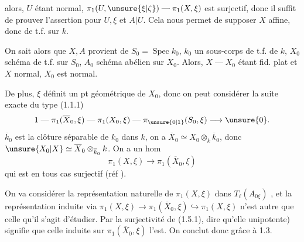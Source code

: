 alors,  $U$ étant normal, $\pi_1(U,\unsure{\xi|\zeta})\mathrel{\text{---}}\pi_1(X,\xi)$ est surjectif, donc il  suffit de prouver l'assertion pour $U,\xi$ et $A|U$. Cela nous permet de supposer $X$ affine, donc de t.f. sur $k$.

On sait alors que $X,A$ provient de $S_0=\operatorname{Spec}k_0$, $k_0$ un sous-corps de t.f. de $k$, $X_0$ schéma de t.f. sur $S_0$, $A_0$ schéma abélien sur $X_0$. Alors,  $X\mathrel{\text{---}}X_0$ étant fid. plat et $X$ normal, $X_0$ est normal.


De plus, $\xi$ définit un pt géométrique de $X_0$, donc on peut considérer  la suite exacte du type (1.1.1)
\[
1\mathrel{\text{---}}\pi_1(\overline X_0,\xi)\mathrel{\text{---}}\pi_1(X_0,\xi)\mathrel{\text{---}}\pi_{\unsure{0|1}}(S_0,\xi)\longrightarrow\unsure{0}.
\]
 $\overline k_0$ est la clôture séparable de $k_0$ dans $k$, on a $\overline X_0\simeq X_0\otimes_{k}\overline k_0$, donc $\unsure{X_0|X}\simeq\overline X_0\otimes_{\overline k_0}k$. On a un hom 
\[
\pi_1(X,\xi)\longrightarrow\pi_1(\overline X_0,\xi)
\tag*{(1.5.1)}
\]
qui est en tous cas surjectif  (réf \quad).

On va considérer la représentation naturelle de $\pi_1(X,\xi)$ dans $T_\ell(A_{0\xi})$ , et la représentation induite via $\pi_1(X,\xi)\longrightarrow\pi_1(\overline X_0,\xi)\hookrightarrow\pi_1(X,\xi)$ n'est autre que celle qu'il s'agit d'étudier.  Par la surjectivité de (1.5.1), dire qu'elle    unipotente) signifie que celle induite sur $\pi_1(\overline X_0,\xi)$ l'est.  On conclut donc grâce à 1.3.
